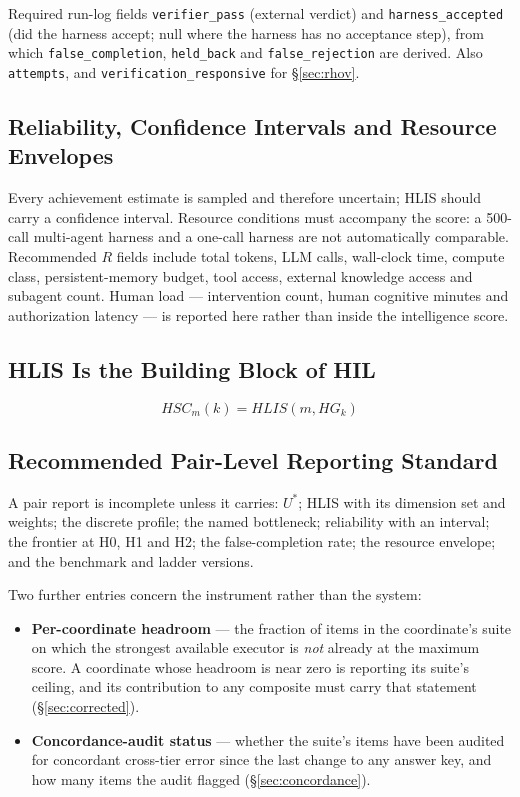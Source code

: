 \documentclass[11pt]{article}
\theoremstyle{definition}
\begin{document}
\begin{claimbox}{Required run-log fields}
\texttt{verifier\_pass} (external verdict) and \texttt{harness\_accepted} (did the harness accept; null where the harness has no acceptance step), from which \texttt{false\_completion}, \texttt{held\_back} and \texttt{false\_rejection} are derived. Also \texttt{attempts}, and \texttt{verification\_responsive} for \S\ref{sec:rhov}.
\end{claimbox}

\subsection{Reliability, Confidence Intervals and Resource Envelopes}\label{sec:resources}

Every achievement estimate is sampled and therefore uncertain; HLIS should carry a confidence interval. Resource conditions must accompany the score: a 500-call multi-agent harness and a one-call harness are not automatically comparable. Recommended $R$ fields include total tokens, LLM calls, wall-clock time, compute class, persistent-memory budget, tool access, external knowledge access and subagent count. Human load --- intervention count, human cognitive minutes and authorization latency --- is reported here rather than inside the intelligence score.

\subsection{HLIS Is the Building Block of HIL}

\begin{equation}
HSC_m(k) = HLIS(m, HG_k)
\end{equation}

\subsection{Recommended Pair-Level Reporting Standard}\label{sec:report}

A pair report is incomplete unless it carries: $U^{*}$; HLIS with its dimension set and weights; the discrete profile; the named bottleneck; reliability with an interval; the frontier at H0, H1 and H2; the false-completion rate; the resource envelope; and the benchmark and ladder versions.

Two further entries concern the instrument rather than the system:

\begin{itemize}
\item \textbf{Per-coordinate headroom} --- the fraction of items in the coordinate's suite on which the strongest available executor is \emph{not} already at the maximum score. A coordinate whose headroom is near zero is reporting its suite's ceiling, and its contribution to any composite must carry that statement (\S\ref{sec:corrected}).
\item \textbf{Concordance-audit status} --- whether the suite's items have been audited for concordant cross-tier error since the last change to any answer key, and how many items the audit flagged (\S\ref{sec:concordance}).
\end{itemize}
\end{document}
